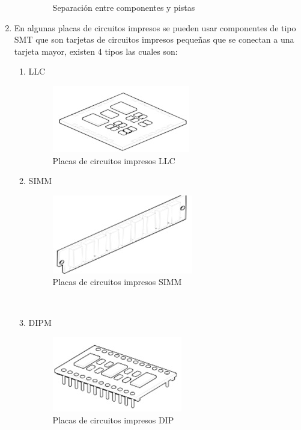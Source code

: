 \documentclass[a4paper,12pt,twoside]{proyectotanquesecci}
\begin{document}
\begin{enumerate}
\begin{enumerate}
\begin{figure}[h]
 \renewcommand{\figurename}{Fig.}
 \caption{Separación entre componentes y pistas}
 \label{Separación entre componentes y pistas }
 \end{figure}
\end{enumerate}
\item En algunas placas de circuitos impresos se pueden usar componentes de tipo SMT que son tarjetas de circuitos impresos pequeñas que se conectan a una tarjeta mayor, existen 4 tipos  las cuales son:
\begin{enumerate}
\item LLC 
\begin{figure}[h]
 \centering
 \includegraphics[scale=1.3]{LLC.jpg}
 \renewcommand{\figurename}{Fig.}
 \caption{Placas de circuitos impresos LLC}
 \label{Placas de circuitos impresos LLC}
 \end{figure}
\item SIMM
\begin{figure}[h]
 \centering
 \includegraphics[scale=1.0]{SIMM.jpg}
 \renewcommand{\figurename}{Fig.}
 \caption{Placas de circuitos impresos SIMM}
 \label{Placas de circuitos impresos SIMM}
 \end{figure}\\
   
 \item DIPM
 \begin{figure}[h]
  \centering
  \includegraphics[scale=1.0]{DIP.jpg}
  \renewcommand{\figurename}{Fig.}
  \caption{Placas de circuitos impresos DIP }
  \label{Placas de circuitos impresos DIP}
  \end{figure}
 

\end{enumerate}
\end{enumerate}
\end{document}

